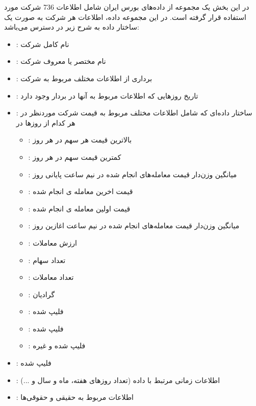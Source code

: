 در این بخش یک مجموعه از داده‌های بورس ایران شامل اطلاعات 736 شرکت مورد استفاده قرار گرفته است. در این مجموعه داده، اطلاعات هر شرکت به صورت یک ساختار داده به شرح زیر در دسترس می‌باشد:
\begin{itemize}
	\item {}: نام كامل شرکت
	\item {}: نام مختصر یا معروف شرکت
	\item {}: برداری از اطلاعات مختلف مربوط به شرکت 
	\item  {}: تاریخ روزهایی که اطلاعات مربوط به آنها در بردار  وجود دارد
	\item {}: ساختار داده‌ای که شامل اطلاعات مختلف مربوط به قیمت شرکت موردنظر در هر كدام از
	روزها در 
	\begin{itemize}
		\item {}: بالاترین قیمت هر سهم در هر روز
		\item  {}: کمترین قیمت سهم در هر روز
		\item {}: میانگین وزن‌دار قیمت معامله‌های انجام شده در نیم ساعت پایانی روز
		\item {}: قیمت اخرین معامله ی انجام شده
		\item {}: قیمت اولین معامله ی انجام شده
		\item {}: میانگین وزن‌دار قیمت معامله‌های انجام شده در نیم ساعت اغازین روز
		\item {}: ارزش معاملات
		\item {}: تعداد سهام
		\item {}: تعداد معاملات
		\item {}: گرادیان
		\item {}: فلیپ شده 
		\item {}: فلیپ شده 
		\item {}: فلیپ شده  و غیره
	\end{itemize}
	\item {}: فلیپ شده 
	\item {}: اطلاعات زمانی مرتبط با داده (تعداد روزهای هفته، ماه و سال و ...)
	\item {}: اطلاعات مربوط به حقیقی و حقوقی‌ها	
\end{itemize}



